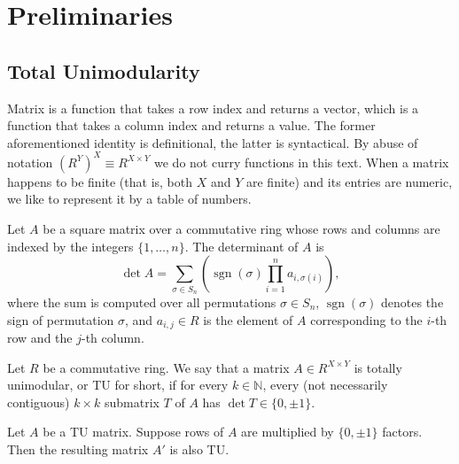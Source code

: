 \section{Preliminaries}

\subsection{Total Unimodularity}

\begin{definition}
    \label{Matrix}
    \leanok
    Matrix is a function that takes a row index and returns a vector, which is a function that takes a column index and returns a value.
    The former aforementioned identity is definitional, the latter is syntactical.
    By abuse of notation $\left(R^Y\right)^X \equiv R^{X \times Y}$ we do not curry functions in this text.
    When a matrix happens to be finite (that is, both $X$ and $Y$ are finite) and its entries are numeric, we like to represent it by a table of numbers.
\end{definition}

\begin{definition}
    \label{Matrix.det}
    \leanok
    Let $A$ be a square matrix over a commutative ring whose rows and columns are indexed by the integers $\{1, \dots, n\}$.
    The determinant of $A$ is
    \[
        \det A = \sum_{\sigma \in S_{n}} \left( \operatorname{sgn}(\sigma) \prod_{i = 1}^{n} a_{i, \sigma(i)} \right),
    \]
    where the sum is computed over all permutations $\sigma \in S_{n}$, $\operatorname{sgn}(\sigma)$ denotes the sign of permutation $\sigma$,
    and $a_{i,j} \in R$ is the element of $A$ corresponding to the $i$-th row and the $j$-th column.
\end{definition}

\begin{definition}
    \label{Matrix.IsTotallyUnimodular}
    \leanok
    Let $R$ be a commutative ring. We say that a matrix $A \in R^{X \times Y}$ is totally unimodular, or TU for short, if for every $k \in \mathbb{N}$, every (not necessarily contiguous) $k \times k$ submatrix $T$ of $A$ has $\det T \in \{0, \pm 1\}$.
\end{definition}

\begin{lemma}
    \label{Matrix.IsTotallyUnimodular.mul_rows}
    \leanok
    Let $A$ be a TU matrix. Suppose rows of $A$ are multiplied by $\{0, \pm 1\}$ factors. Then the resulting matrix $A'$ is also TU.
\end{lemma}

